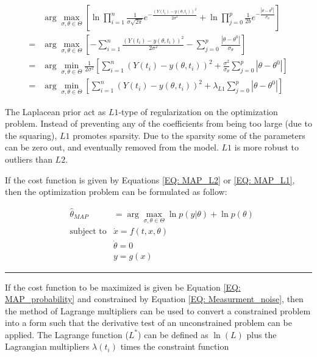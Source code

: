 \documentclass[a4paper,fleqn]{cas-dc}
\begin{document}
{\footnotesize
\begin{equation} \label{EQ: MAP_L1}
	\begin{aligned}
	&\arg\max_{\sigma, \theta \in \Theta} \left[ \ln \prod_{i=1}^{n} \frac{1}{\sigma\sqrt{2\pi}}e^{-\frac{ \left( Y(t_i) - y\left( \theta, t_i \right) \right)^2 }{2\sigma^2}}
	+ \ln \prod_{j=0}^{p} \frac{1}{2b}e^{-\frac{ | \theta - \theta^0 | }{\sigma_\theta}} \right]  \\
	= &\arg\max_{\sigma, \theta \in \Theta} \left[- \sum_{i=1}^{n} {\frac{\left( Y(t_i) - y\left( \theta, t_i \right) \right)^2}{2\sigma^2}}
	- \sum_{j=0}^{p} {\frac{ | \theta - \theta^0 | }{\sigma_\theta}} \right]\\
	= &\arg\min_{\sigma, \theta \in \Theta} \frac{1}{2\sigma^2} \left[ \sum_{i=1}^{n} \left( Y(t_i) - y\left( \theta, t_i \right) \right)^2
	+ \frac{\sigma^2}{\sigma_\theta} \sum_{j=0}^{p} | \theta - \theta^0 | \right] \\
	= &\arg\min_{\sigma, \theta \in \Theta} \left[ \sum_{i=1}^{n} \left( Y(t_i) - y\left( \theta, t_i \right) \right)^2 + \lambda_{L1} \sum_{j=0}^{p} | \theta - \theta^0 | \right]
	\end{aligned}
\end{equation} }

The Laplacean prior act as $L1$-type of regularization on the optimization problem. Instead of preventing any of the coefficients from being too large (due to the squaring), $L1$ promotes sparsity. Due to the sparsity some of the parameters can be zero out, and eventually removed from the model. $L1$ is more robust to outliers than $L2$. 

If the cost function is given by Equations \ref{EQ: MAP_L2} or \ref{EQ: MAP_L1}, then the optimization problem can be formulated as follow:

{\footnotesize
	\begin{equation}
		\begin{aligned}
			&\hat{\theta}_{MAP} &= \arg\max_{\sigma, \theta \in \Theta} \ln p(y | \theta) + \ln p(\theta) \\
			&\text{subject to}
			& \dot{x} = f(t,x,\theta) \\
			&& \dot{\theta} = 0 \\
			&& y = g(x)
		\end{aligned}
\end{equation} }

\hrule
If the cost function to be maximized is given be Equation \ref{EQ: MAP_probability} and constrained by Equation \ref{EQ: Measurment_noise}, then the method of Lagrange multipliers can be used to convert a constrained problem into a form such that the derivative test of an unconstrained problem can be applied. The Lagrange function ($L^*$) can be defined as $\ln(L)$ plus the Lagrangian multipliers $\lambda(t_i)$ times the constraint function
\end{document}
